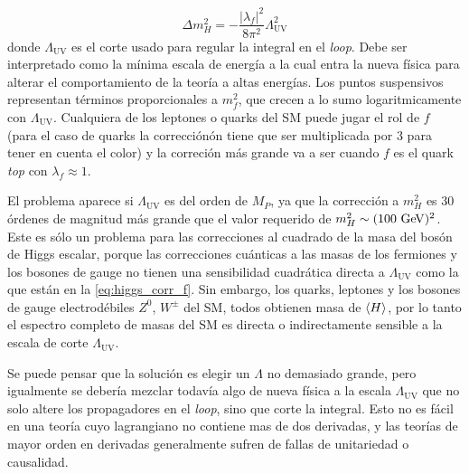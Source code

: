 \begin{equation}
  \Delta m_H^2 = -\frac{|\lambda_f|^2}{8\pi^2} \Lambda^2_{\text{UV}} %
  \label{eq:higgs_corr_f}
\end{equation}
%
donde $\Lambda_\text{UV}$ es el corte usado para regular la integral en el
\emph{loop}. Debe ser interpretado como la m\'inima escala de energ\'ia a la
cual entra la nueva física para alterar el comportamiento de la teoría a altas
energías. Los puntos suspensivos representan términos proporcionales a $m_f^2$,
que crecen a lo sumo logaritmicamente con $\Lambda_\text{UV}$. Cualquiera de los
leptones o quarks del SM puede jugar el rol de $f$ (para el caso de quarks la
correcciónón tiene que ser multiplicada por 3 para tener en cuenta el color) y
la correción m\'as grande va a ser cuando $f$ es el quark \emph{top} con
$\lambda_f \approx 1$.

El problema aparece si $\Lambda_\text{UV}$ es del orden de $M_P$, ya que la
corrección a $m_H^2$ es 30 órdenes de magnitud más grande que el valor requerido
de $m_H^2 \sim (100 \gev)^2$. Este es sólo un problema para las correcciones al
cuadrado de la masa del bosón de Higgs escalar, porque las correcciones
cuánticas a las masas de los fermiones y los bosones de gauge no tienen una
sensibilidad cuadrática directa a $\Lambda_\text{UV}$ como la que están en la
\cref{eq:higgs_corr_f}. Sin embargo, los quarks, leptones y los bosones de gauge
electrodébiles $Z^0$, $W^{\pm}$ del SM, todos obtienen masa de $\langle H \rangle$, por
lo tanto el espectro completo de masas del SM es directa o indirectamente
sensible a la escala de corte $\Lambda_\text{UV}$.

Se puede pensar que la solución es elegir un $\Lambda$ no demasiado grande, pero
igualmente se debería mezclar todavía algo de nueva física a la escala
$\Lambda_\text{UV}$ que no solo altere los propagadores en el \emph{loop}, sino que
corte la integral. Esto no es fácil en una teoría cuyo lagrangiano no contiene
mas de dos derivadas, y las teorías de mayor orden en derivadas generalmente
sufren de fallas de unitariedad o causalidad.


